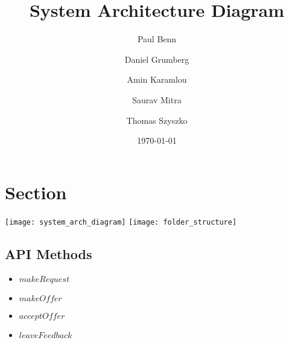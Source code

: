 \documentclass[a4wide, 11pt]{article}
\begin{document}
\title{System Architecture Diagram}

\author{Paul Benn \and Daniel Grumberg \and Amin Karamlou \and Saurav Mitra \and Thomas Szyszko }

\date{\today}

\maketitle

\clearpage

\section{Section}

\texttt{[image: system\_arch\_diagram]}
\texttt{[image: folder\_structure]}

\subsection{API Methods} 
\begin{itemize}
  \item $makeRequest$
  \item $makeOffer$
  \item $acceptOffer$
  \item $leaveFeedback$
\end{itemize}
\end{document}
